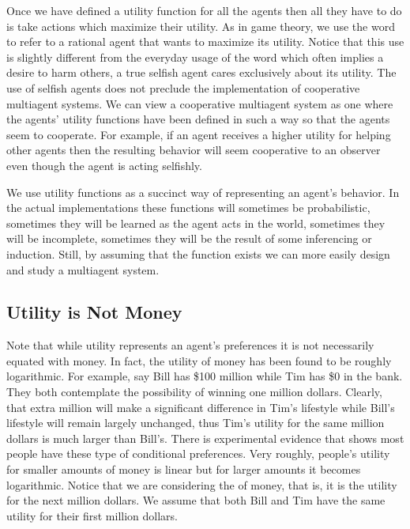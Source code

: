 Once we have defined a utility function for all the agents then all
they have to do is take actions which maximize their utility. As in
game theory, we use the word  to refer to a rational agent
that wants to maximize its utility. Notice that this use is slightly
different from the everyday usage of the word which often implies a
desire to harm others, a true selfish agent cares exclusively about
its utility. The use of selfish agents does not preclude the
implementation of cooperative multiagent systems.
We can view
a cooperative multiagent system as one where the agents' utility
functions have been defined in such a way so that the agents seem to
cooperate. For example, if an agent receives a higher utility for
helping other agents then the resulting behavior will seem cooperative
to an observer even though the agent is acting selfishly.

We use utility functions as a succinct way of representing an agent's
behavior. In the actual implementations these functions will sometimes
be probabilistic, sometimes they will be learned as the agent acts in
the world, sometimes they will be incomplete, sometimes they will be
the result of some inferencing or induction. Still, by assuming that
the function exists we can more easily design and study a multiagent
system.


\subsection{Utility is Not Money}
\label{sec:money}

Note that while utility represents an agent's preferences it is not
necessarily equated with money. In fact, the utility of money has been
found to be roughly logarithmic. For example, say Bill has \$100
million while Tim has \$0 in the bank. They both contemplate the
possibility of winning one million dollars. Clearly, that extra
million will make a significant difference in Tim's lifestyle while
Bill's lifestyle will remain largely unchanged, thus Tim's utility for
the same million dollars is much larger than Bill's. There is
experimental evidence that shows most people have these type of
conditional preferences. Very roughly, people's utility for smaller
amounts of money is linear but for larger amounts it becomes
logarithmic. Notice that we are considering the 
of money, that is, it is the utility for the next million dollars.  We
assume that both Bill and Tim have the same utility for their first
million dollars.  

